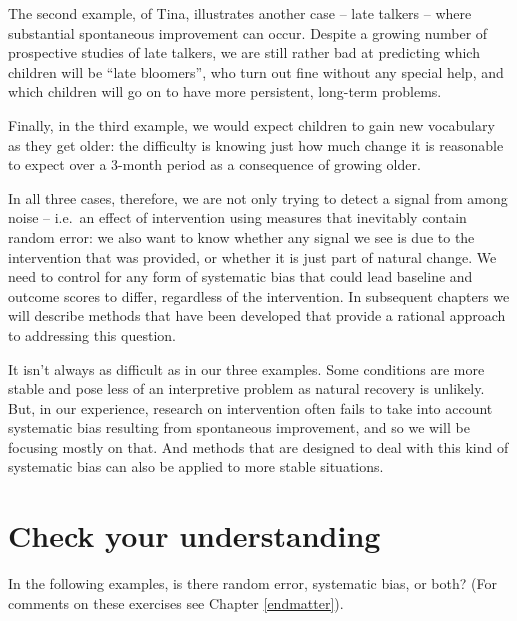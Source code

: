 \documentclass{krantz}
\begin{document}
The second example, of Tina, illustrates another case -- late talkers -- where substantial spontaneous improvement can occur. Despite a growing number of prospective studies of late talkers, we are still rather bad at predicting which children will be ``late bloomers'', who turn out fine without any special help, and which children will go on to have more persistent, long-term problems.

Finally, in the third example, we would expect children to gain new vocabulary as they get older: the difficulty is knowing just how much change it is reasonable to expect over a 3-month period as a consequence of growing older.

In all three cases, therefore, we are not only trying to detect a signal from among noise -- i.e.~an effect of intervention using measures that inevitably contain random error: we also want to know whether any signal we see is due to the intervention that was provided, or whether it is just part of natural change. We need to control for any form of systematic bias that could lead baseline and outcome scores to differ, regardless of the intervention. In subsequent chapters we will describe methods that have been developed that provide a rational approach to addressing this question.

It isn't always as difficult as in our three examples. Some conditions are more stable and pose less of an interpretive problem as natural recovery is unlikely. But, in our experience, research on intervention often fails to take into account systematic bias resulting from spontaneous improvement, and so we will be focusing mostly on that. And methods that are designed to deal with this kind of systematic bias can also be applied to more stable situations.

\hypertarget{check-your-understanding}{%
\section{Check your understanding}\label{check-your-understanding}}

In the following examples, is there random error, systematic bias, or both? (For comments on these exercises see Chapter \ref{endmatter}).
\end{document}
